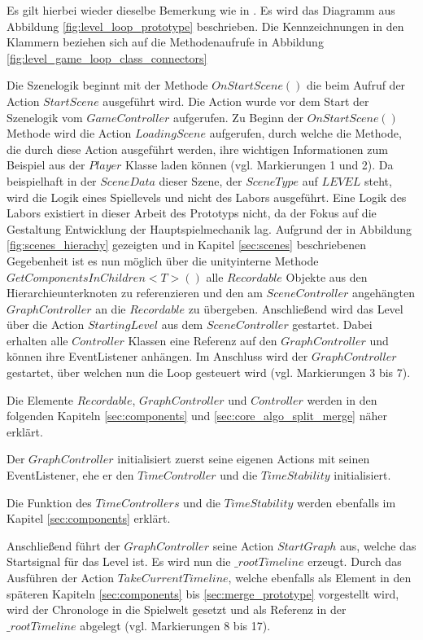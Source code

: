 Es gilt hierbei wieder dieselbe Bemerkung wie in . Es wird das Diagramm aus Abbildung \ref{fig:level_loop_prototype}  beschrieben. Die Kennzeichnungen in den Klammern beziehen sich auf die Methodenaufrufe in Abbildung \ref{fig:level_game_loop_class_connectors} 

Die Szenelogik beginnt mit der Methode $OnStartScene()$ die beim Aufruf der Action $StartScene$ ausgeführt wird. Die Action wurde vor dem Start der Szenelogik vom $GameController$ aufgerufen. Zu Beginn der $OnStartScene()$ Methode wird die Action $LoadingScene$ aufgerufen, durch welche die Methode, die durch diese Action ausgeführt werden, ihre wichtigen Informationen zum Beispiel aus der $Player$ Klasse laden können (vgl. Markierungen 1 und 2). Da beispielhaft in der $SceneData$ dieser Szene, der $SceneType$ auf $LEVEL$ steht, wird die Logik eines Spiellevels und nicht des Labors ausgeführt. Eine Logik des Labors existiert in dieser Arbeit des Prototyps nicht, da der Fokus auf die Gestaltung Entwicklung der Hauptspielmechanik lag. Aufgrund der in Abbildung \ref{fig:scenes_hierachy} gezeigten und in Kapitel \ref{sec:scenes} beschriebenen Gegebenheit ist es nun möglich über die unityinterne Methode $GetComponentsInChildren<T>()$ alle $Recordable$ Objekte aus den Hierarchieunterknoten zu referenzieren und den am $SceneController$ angehängten $GraphController$ an die $Recordable$ zu übergeben. Anschließend wird das Level über die Action $StartingLevel$ aus dem $SceneController$ gestartet. Dabei erhalten alle $Controller$ Klassen eine Referenz auf den $GraphController$ und können ihre EventListener anhängen. Im Anschluss wird der $GraphController$ gestartet, über welchen nun die Loop gesteuert wird (vgl. Markierungen 3 bis 7).

Die Elemente $Recordable$, $GraphController$ und $Controller$ werden in den folgenden Kapiteln \ref{sec:components} und \ref{sec:core_algo_split_merge} näher erklärt.

Der $GraphController$ initialisiert zuerst seine eigenen Actions mit seinen EventListener, ehe er den $TimeController$ und die $TimeStability$ initialisiert. 

Die Funktion des $TimeControllers$ und die $TimeStability$ werden ebenfalls im Kapitel \ref{sec:components} erklärt.

Anschließend führt der $GraphController$ seine Action $StartGraph$ aus, welche das Startsignal für das Level ist. Es wird nun die $\_rootTimeline$ erzeugt. Durch das Ausführen der Action $TakeCurrentTimeline$, welche ebenfalls als Element in den späteren Kapiteln \ref{sec:components} bis \ref{sec:merge_prototype} vorgestellt wird, wird der Chronologe in die Spielwelt gesetzt und als Referenz in der $\_rootTimeline$ abgelegt (vgl. Markierungen 8 bis 17).

